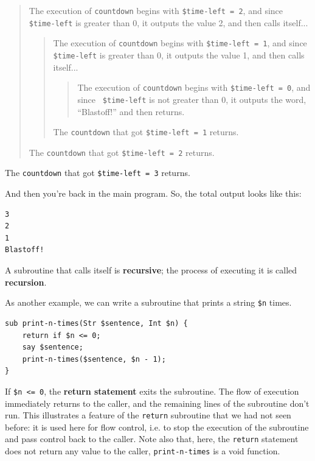 \begin{quote}
The execution of {\tt countdown} begins with {\tt \$time-left = 2}, and since
{\tt \$time-left} is greater than 0, it outputs the value 2, and then calls itself...

\begin{quote}
The execution of {\tt countdown} begins with {\tt \$time-left = 1}, and since
{\tt \$time-left} is greater than 0, it outputs the value 1, and then calls itself...

\begin{quote}
The execution of {\tt countdown} begins with {\tt \$time-left = 0}, and since {\tt
\$time-left} is not greater than 0, it outputs the word, ``Blastoff!'' and then
returns.
\end{quote}

The {\tt countdown} that got {\tt \$time-left = 1} returns.
\end{quote}

The {\tt countdown} that got {\tt \$time-left = 2} returns.
\end{quote}

The {\tt countdown} that got {\tt \$time-left = 3} returns.

And then you're back in the main program.  So, the
total output looks like this:

\begin{verbatim}
3
2
1
Blastoff!
\end{verbatim}
%
A subroutine that calls itself is {\bf recursive}; the process of
executing it is called {\bf recursion}.

As another example, we can write a subroutine that prints a
string {\tt \$n} times.

\begin{verbatim}
sub print-n-times(Str $sentence, Int $n) {
    return if $n <= 0;
    say $sentence;
    print-n-times($sentence, $n - 1);
}
\end{verbatim}
%
If {\tt \$n <= 0}, the {\bf return statement} exits the
subroutine.  The flow of execution immediately returns to 
the caller, and the remaining lines of the subroutine don't
run. This illustrates a feature of the {\tt return} subroutine 
that we had not seen before: it is used here for flow 
control, i.e. to stop the execution of the subroutine and 
pass control back to the caller. Note also that, here, the 
{\tt return} statement does not return any value to the 
caller, {\tt print-n-times} is a void function.

